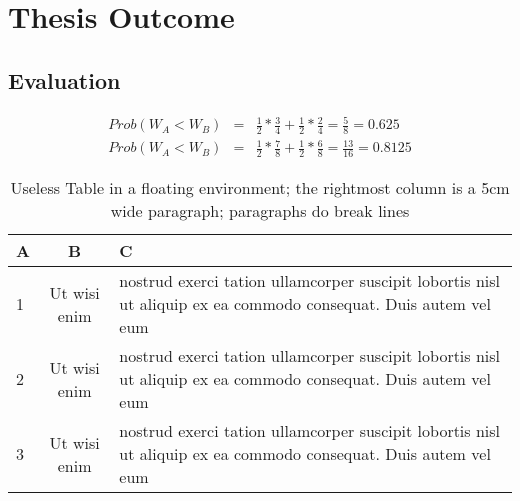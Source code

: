 \chapter{Thesis Outcome}
\label{cha:thesis_outcome}
\blindtext
\section{Evaluation}
\label{sec:evaluation}
\Blindtext
\begin{eqnarray} \label{eqn:formula}
    Prob(W_A < W_B) &=& \frac{1}{2} * \frac{3}{4} + \frac{1}{2} * \frac{2}{4} = \frac{5}{8} = 0.625 \\
    Prob(W_A < W_B) &=& \frac{1}{2} * \frac{7}{8} + \frac{1}{2} * \frac{6}{8} = \frac{13}{16} = 0.8125
\end{eqnarray}
\Blindtext

\begin{table}
    \centering
    \begin{tabular}{l|c|p{5cm}} \toprule
        A & B & C \\ \midrule
        1 & Ut wisi enim & nostrud exerci tation ullamcorper suscipit lobortis nisl ut aliquip ex ea commodo consequat. Duis autem vel eum \\
        2 & Ut wisi enim & nostrud exerci tation ullamcorper suscipit lobortis nisl ut aliquip ex ea commodo consequat. Duis autem vel eum \\
        3 & Ut wisi enim & nostrud exerci tation ullamcorper suscipit lobortis nisl ut aliquip ex ea commodo consequat. Duis autem vel eum \\
        \bottomrule
    \end{tabular}
    \caption[Useless Table]{Useless Table in a floating environment; the rightmost column is a 5cm wide paragraph; paragraphs do break lines}
    \label{tab:table}
\end{table}
